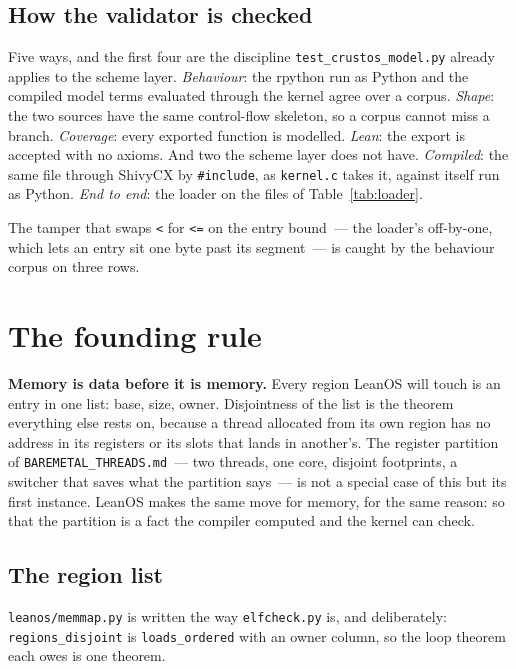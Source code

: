\documentclass[11pt]{article}
\begin{document}
\subsection{How the validator is checked}

Five ways, and the first four are the discipline
\texttt{test\_crustos\_model.py} already applies to the scheme layer.
\emph{Behaviour}: the rpython run as Python and the compiled model terms
evaluated through the kernel agree over a corpus.  \emph{Shape}: the two
sources have the same control-flow skeleton, so a corpus cannot miss a
branch.  \emph{Coverage}: every exported function is modelled.
\emph{Lean}: the export is accepted with no axioms.  And two the scheme
layer does not have.  \emph{Compiled}: the same file through ShivyCX by
\texttt{\#include}, as \texttt{kernel.c} takes it, against itself run as
Python.  \emph{End to end}: the loader on the files of
Table~\ref{tab:loader}.

The tamper that swaps \texttt{<} for \texttt{<=} on the entry bound~---
the loader's off-by-one, which lets an entry sit one byte past its
segment~--- is caught by the behaviour corpus on three rows.

\section{The founding rule}\label{sec:founding}

\textbf{Memory is data before it is memory.}  Every region LeanOS will
touch is an entry in one list: base, size, owner.  Disjointness of the
list is the theorem everything else rests on, because a thread allocated
from its own region has no address in its registers or its slots that
lands in another's.  The register partition of
\texttt{BAREMETAL\_THREADS.md}~--- two threads, one core, disjoint
footprints, a switcher that saves what the partition says~--- is not a
special case of this but its first instance.  LeanOS makes the same move
for memory, for the same reason: so that the partition is a fact the
compiler computed and the kernel can check.

\subsection{The region list}

\texttt{leanos/memmap.py} is written the way \texttt{elfcheck.py} is, and
deliberately: \texttt{regions\_disjoint} is \texttt{loads\_ordered} with an
owner column, so the loop theorem each owes is one theorem.
\end{document}

